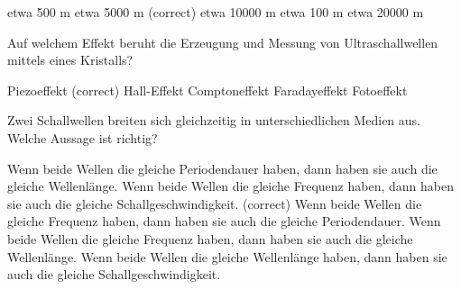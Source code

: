 \documentclass[11pt]{exam}
\begin{document}
\begin{questions}
\begin{choices}
	\choice etwa 500 m
	\choice etwa 5000 m (correct)
	\choice etwa 10000 m
	\choice etwa 100 m
	\choice etwa 20000 m
\end{choices}

\vspace{3mm}\question Auf welchem Effekt beruht die Erzeugung und Messung von Ultraschallwellen mittels eines Kristalls?

\begin{choices}
	\choice Piezoeffekt (correct)
	\choice Hall-Effekt
	\choice Comptoneffekt
	\choice Faradayeffekt
	\choice Fotoeffekt
\end{choices}

\vspace{3mm}\question Zwei Schallwellen breiten sich gleichzeitig in unterschiedlichen Medien aus. Welche Aussage ist richtig?

\begin{choices}
	\choice Wenn beide Wellen die gleiche Periodendauer haben, dann haben sie auch die gleiche Wellenlänge.
	\choice Wenn beide Wellen die gleiche Frequenz haben, dann haben sie auch die gleiche Schallgeschwindigkeit. (correct)
	\choice Wenn beide Wellen die gleiche Frequenz haben, dann haben sie auch die gleiche Periodendauer.
	\choice Wenn beide Wellen die gleiche Frequenz haben, dann haben sie auch die gleiche Wellenlänge.
	\choice Wenn beide Wellen die gleiche Wellenlänge haben, dann haben sie auch die gleiche Schallgeschwindigkeit.
\end{choices}

\vspace{3mm}\end{questions}
\end{document}
